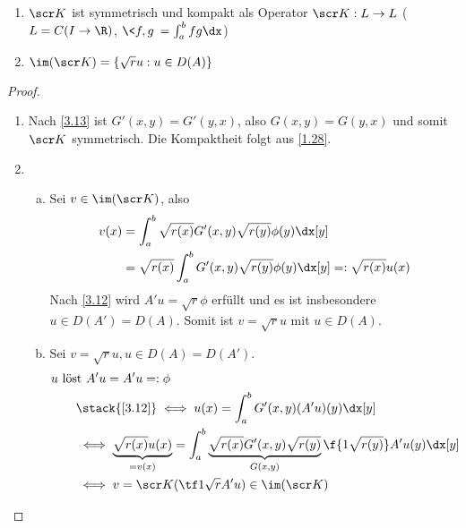 \begin{lem} \label{3.18}
	\begin{enumerate}[1)]
		\item
			$\scr K$ ist symmetrisch und kompakt als Operator $\scr K : L \to L$ ($L = C(I \to \R)$, $\<f,g\> = \int_a^b fg \dx$)
		\item
			$\im(\scr K) = \{\sqrt{r} u : u \in D(A)\}$
	\end{enumerate}
	\begin{proof}
		\begin{enumerate}[1)]
			\item
				Nach \ref{3.13} ist $G'(x,y) = G'(y,x)$, also $G(x,y) = G(y,x)$ und somit $\scr K$ symmetrisch.
				Die Kompaktheit folgt aus \ref{1.28}.
			\item
				\begin{enumerate}[a)]
					\item
						Sei $v \in \im(\scr K)$, also
						\begin{align*}
							v(x) 
							&= \int_a^b \sqrt{r(x)} G'(x,y) \sqrt{r(y)} \phi(y) \dx[y] \\
							&= \sqrt{r(x)} \int_a^b G'(x,y) \sqrt{r(y)} \phi(y) \dx[y] =: \sqrt{r(x)} u(x)
						\end{align*}
						Nach \ref{3.12} wird $A'u= \sqrt{r} \phi$ erfüllt und es ist insbesondere $u \in  D(A') = D(A)$.
						Somit ist $v = \sqrt{r} u$ mit $u \in D(A)$.
					\item
						Sei $v = \sqrt{r} u, u \in D(A) = D(A')$.
						\begin{align*}
							&\text{$u$ löst $A'u = A'u =: \phi$} \\
							&\qquad \stack{\ref{3.12}}\iff u(x) = \int_a^b G'(x,y) (A'u)(y) \dx[y] \\
							&\qquad \iff \underbrace{\sqrt{r(x)}  u(x)}_{=v(x)} = \int_a^b \underbrace{\sqrt{r(x)} G'(x,y) \sqrt{r(y)}}_{G(x,y)} \f{1{\sqrt{r(y)}}} A'u(y) \dx[y] \\
							&\qquad \iff v = \scr K (\tf 1{\sqrt{r}}A'u) \in \im (\scr K)
						\end{align*}
				\end{enumerate}
		\end{enumerate}
	\end{proof}
\end{lem}

